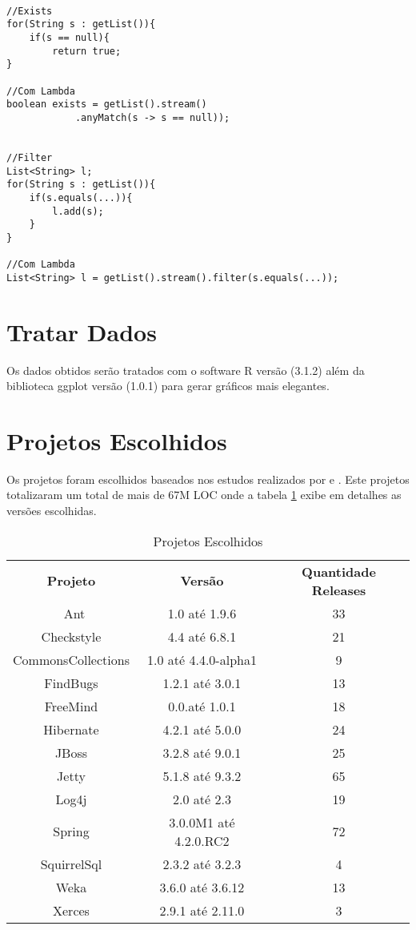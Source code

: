 \begin{lstlisting}

//Exists
for(String s : getList()){
	if(s == null){
		return true;
}

//Com Lambda
boolean exists = getList().stream()
            .anyMatch(s -> s == null));
            

//Filter
List<String> l;
for(String s : getList()){
	if(s.equals(...)){
		l.add(s);
	}
}

//Com Lambda
List<String> l = getList().stream().filter(s.equals(...));

\end{lstlisting}


\section{Tratar Dados}
Os dados obtidos serão tratados com o software R \cite{R} versão (3.1.2) além da biblioteca ggplot \cite{ggplot} versão (1.0.1) para gerar gráficos mais elegantes.


\section{Projetos Escolhidos}
Os projetos foram escolhidos baseados nos estudos realizados por \cite{Parnin:ACM2011} e \cite{Dyer:ACM2014}. Este projetos totalizaram um total de mais de 67M \acs{LOC} onde a tabela \ref{tab:ProjetosEscolhidos} exibe em detalhes as versões escolhidas.


\begin{table}[ht]
	\centering
	\caption{Projetos Escolhidos}
	\label{tab:ProjetosEscolhidos}
	\begin{tabular}{c|c|c}
		\hline \hline
		\textbf{Projeto}    &   \textbf{Versão} & \textbf{Quantidade Releases}\\ \
	      Ant & 1.0 até 1.9.6 & 33\\
	      Checkstyle & 4.4 até 6.8.1 & 21\\
	      CommonsCollections & 1.0 até 4.4.0-alpha1 & 9\\
	      FindBugs & 1.2.1 até 3.0.1 & 13\\
	      FreeMind & 0.0.até 1.0.1 & 18\\
	      Hibernate & 4.2.1 até 5.0.0 & 24\\
	      JBoss & 3.2.8 até 9.0.1 & 25\\
	      Jetty & 5.1.8 até 9.3.2 & 65\\
	      Log4j & 2.0 até 2.3 & 19\\
	      Spring & 3.0.0M1 até 4.2.0.RC2 & 72\\
	      SquirrelSql & 2.3.2 até 3.2.3 & 4\\
	      Weka & 3.6.0 até 3.6.12 & 13\\
	      Xerces & 2.9.1 até 2.11.0 & 3\\
	      
      \hline
    \end{tabular}
\end{table}